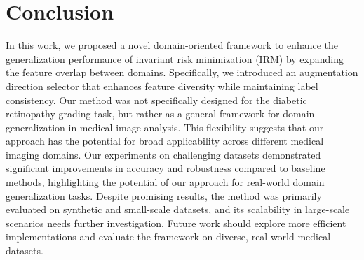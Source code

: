 \section{Conclusion}
\label{sec:conclusion}


In this work, we proposed a novel domain-oriented framework to enhance the generalization performance of invariant risk minimization (IRM) by expanding the feature overlap between domains. 
Specifically, we introduced an augmentation direction selector that enhances feature diversity while maintaining label consistency. 
Our method was not specifically designed for the diabetic retinopathy grading task, but rather as a general framework for domain generalization in medical image analysis. 
This flexibility suggests that our approach has the potential for broad applicability across different medical imaging domains. 
Our experiments on challenging datasets demonstrated significant improvements in accuracy and robustness compared to baseline methods, highlighting the potential of our approach for real-world domain generalization tasks. 
Despite promising results, the method was primarily evaluated on synthetic and small-scale datasets, and its scalability in large-scale scenarios needs further investigation. 
Future work should explore more efficient implementations and evaluate the framework on diverse, real-world medical datasets.
